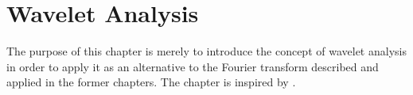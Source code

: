 \chapter{Wavelet Analysis}
The purpose of this chapter is merely to introduce the concept of wavelet analysis in order to apply it as an alternative to the Fourier transform described and applied in the former chapters. The chapter is inspired by \cite{page 159-?, FSE2010} .

